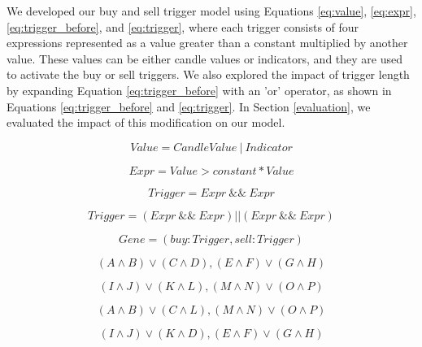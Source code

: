 \documentclass{IEEEtran}
\begin{document}
We developed our buy and sell trigger model using Equations \ref{eq:value}, \ref{eq:expr}, \ref{eq:trigger_before}, and \ref{eq:trigger}, where each trigger consists of four expressions represented as a value greater than a constant multiplied by another value. These values can be either candle values or indicators, and they are used to activate the buy or sell triggers. We also explored the impact of trigger length by expanding Equation \ref{eq:trigger_before} with an 'or' operator, as shown in Equations \ref{eq:trigger_before} and \ref{eq:trigger}. In Section \ref{evaluation}, we evaluated the impact of this modification on our model.

\begin{equation} \label{eq:value}
Value = Candle Value \: | \: Indicator
\end{equation}

\begin{equation} \label{eq:expr}
Expr = Value > constant * Value
\end{equation}

\begin{equation} \label{eq:trigger_before}
Trigger = Expr \: \&\& \: Expr
\end{equation}

\begin{equation} \label{eq:trigger}
Trigger = (Expr \: \&\& \: Expr) || (Expr \: \&\& \: Expr)
\end{equation}

\begin{equation} \label{eq:gene}
Gene = (buy: Trigger, sell: Trigger) 
\end{equation}

\begin{equation} \label{eq:parent1}
(A \land B) \lor (C \land D), (E \land F) \lor (G \land H)
\end{equation}

\begin{equation} \label{eq:parent2}
(I \land J) \lor (K \land L), (M \land N) \lor (O \land P)
\end{equation}

\begin{equation} \label{eq:child1}
(A \land B) \lor (C \land L), (M \land N) \lor( O \land P)
\end{equation}

\begin{equation} \label{eq:child2}
(I \land J) \lor (K \land D),(E \land F) \lor (G \land H)
\end{equation}
\end{document}
